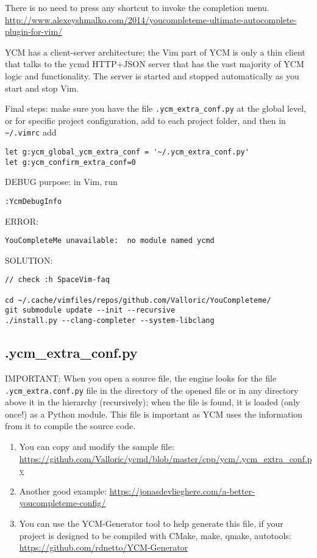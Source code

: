 There is no need to press any shortcut to invoke the completion menu.
\url{http://www.alexeyshmalko.com/2014/youcompleteme-ultimate-autocomplete-plugin-for-vim/}

YCM has a client-server architecture; the Vim part of YCM is only a thin client
that talks to the ycmd HTTP+JSON server that has the vast majority of YCM logic
and functionality. The server is started and stopped automatically as you start
and stop Vim.


Final steps: make sure you have the file 
\verb!.ycm_extra_conf.py! at the global level, or for specific project
configuration, add to each project folder, and then in \verb!~/.vimrc! 
add
\begin{verbatim}
let g:ycm_global_ycm_extra_conf = '~/.ycm_extra_conf.py'
let g:ycm_confirm_extra_conf=0
\end{verbatim}

DEBUG purpose: in Vim, run
\begin{verbatim}
:YcmDebugInfo
\end{verbatim}

ERROR:
\begin{verbatim}
YouCompleteMe unavailable:  no module named ycmd
\end{verbatim}
SOLUTION:
\begin{verbatim}
// check :h SpaceVim-faq

cd ~/.cache/vimfiles/repos/github.com/Valloric/YouCompleteme/
git submodule update --init --recursive
./install.py --clang-completer --system-libclang

\end{verbatim}

 \subsection{.ycm\_extra\_conf.py}
 \label{sec:.ycm_extra_conf.py}




IMPORTANT: When you open a source file, the engine
looks for the file \verb!.ycm_extra.conf.py! file in the directory of the opened file or in any
directory above it in the hierarchy (recursively); when the file is found,
it is loaded (only once!) as a Python module. This file is important as YCM
uses the information from it to compile the source code.


\begin{enumerate}
  \item You can copy and modify the sample file:
\url{https://github.com/Valloric/ycmd/blob/master/cpp/ycm/.ycm_extra_conf.py}
 
  \item Another good example:
  \url{https://jonasdevlieghere.com/a-better-youcompleteme-config/}
  
   \item You can  use the YCM-Generator tool to help generate this file,
   if your project is designed to be compiled with CMake, make, qmake, autotools: 
\url{https://github.com/rdnetto/YCM-Generator}
\end{enumerate}

